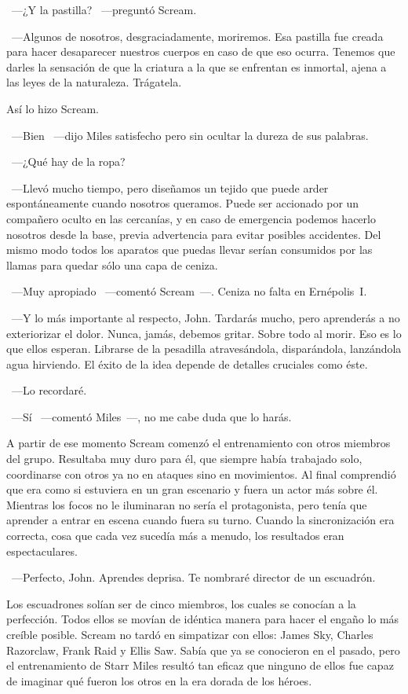 ~---¿Y la pastilla? ~---preguntó Scream.

~---Algunos de nosotros, desgraciadamente, moriremos. Esa pastilla fue creada para hacer desaparecer nuestros cuerpos en caso de que eso ocurra. Tenemos que darles la sensación de que la criatura a la que se enfrentan es inmortal, ajena a las leyes de la naturaleza. Trágatela.

Así lo hizo Scream.

~---Bien ~---dijo Miles satisfecho pero sin ocultar la dureza de sus palabras.

~---¿Qué hay de la ropa?

~---Llevó mucho tiempo, pero diseñamos un tejido que puede arder espontáneamente cuando nosotros queramos. Puede ser accionado por un compañero oculto en las cercanías, y en caso de emergencia podemos hacerlo nosotros desde la base, previa advertencia para evitar posibles accidentes. Del mismo modo todos los aparatos que puedas llevar serían consumidos por las llamas para quedar sólo una capa de ceniza.

~---Muy apropiado ~---comentó Scream~---. Ceniza no falta en Ernépolis~I.

~---Y lo más importante al respecto, John. Tardarás mucho, pero aprenderás a no exteriorizar el dolor. Nunca, jamás, debemos gritar. Sobre todo al morir. Eso es lo que ellos esperan. Librarse de la pesadilla atravesándola, disparándola, lanzándola agua hirviendo. El éxito de la idea depende de detalles cruciales como éste.

~---Lo recordaré.

~---Sí ~---comentó Miles~---, no me cabe duda que lo harás.

A partir de ese momento Scream comenzó el entrenamiento con otros miembros del grupo. Resultaba muy duro para él, que siempre había trabajado solo, coordinarse con otros ya no en ataques sino en movimientos. Al final comprendió que era como si estuviera en un gran escenario y fuera un actor más sobre él. Mientras los focos no le iluminaran no sería el protagonista, pero tenía que aprender a entrar en escena cuando fuera su turno. Cuando la sincronización era correcta, cosa que cada vez sucedía más a menudo, los resultados eran espectaculares.

~---Perfecto, John. Aprendes deprisa. Te nombraré director de un escuadrón.

Los escuadrones solían ser de cinco miembros, los cuales se conocían a la perfección. Todos ellos se movían de idéntica manera para hacer el engaño lo más creíble posible. Scream no tardó en simpatizar con ellos: James Sky, Charles Razorclaw, Frank Raid y Ellis Saw. Sabía que ya se conocieron en el pasado, pero el entrenamiento de Starr Miles resultó tan eficaz que ninguno de ellos fue capaz de imaginar qué fueron los otros en la era dorada de los héroes.

